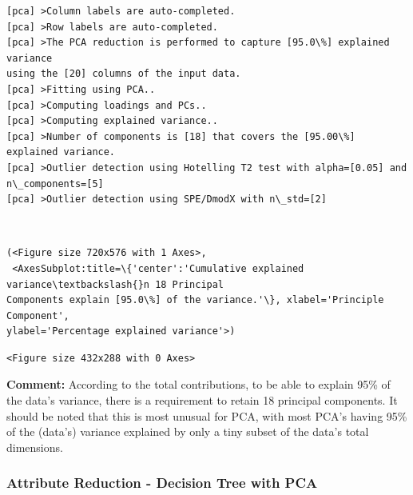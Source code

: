 \documentclass[11pt]{article}
\makeatletter
\newcommand{\boxspacing}{\kern\kvtcb@left@rule\kern\kvtcb@boxsep}
\newcommand{\prompt}[4]{
        {\ttfamily\llap{{\color{#2}[#3]:\hspace{3pt}#4}}\vspace{-\baselineskip}}
    }
\makeatother
\begin{document}
    \begin{Verbatim}[commandchars=\\\{\}]
[pca] >Column labels are auto-completed.
[pca] >Row labels are auto-completed.
[pca] >The PCA reduction is performed to capture [95.0\%] explained variance
using the [20] columns of the input data.
[pca] >Fitting using PCA..
[pca] >Computing loadings and PCs..
[pca] >Computing explained variance..
[pca] >Number of components is [18] that covers the [95.00\%] explained variance.
[pca] >Outlier detection using Hotelling T2 test with alpha=[0.05] and
n\_components=[5]
[pca] >Outlier detection using SPE/DmodX with n\_std=[2]
    \end{Verbatim}

    \begin{center}
    \end{center}
    { \hspace*{\fill} \\}
    
            \begin{tcolorbox}[breakable, size=fbox, boxrule=.5pt, pad at break*=1mm, opacityfill=0]
\prompt{Out}{outcolor}{67}{\boxspacing}
\begin{Verbatim}[commandchars=\\\{\}]
(<Figure size 720x576 with 1 Axes>,
 <AxesSubplot:title=\{'center':'Cumulative explained variance\textbackslash{}n 18 Principal
Components explain [95.0\%] of the variance.'\}, xlabel='Principle Component',
ylabel='Percentage explained variance'>)
\end{Verbatim}
\end{tcolorbox}
        
    
    \begin{Verbatim}[commandchars=\\\{\}]
<Figure size 432x288 with 0 Axes>
    \end{Verbatim}

    
    \textbf{Comment:} According to the total contributions, to be able to
explain 95\% of the data's variance, there is a requirement to retain 18
principal components. It should be noted that this is most unusual for
PCA, with most PCA's having 95\% of the (data's) variance explained by
only a tiny subset of the data's total dimensions.

    \hypertarget{attribute-reduction---decision-tree-with-pca}{%
\subsubsection{Attribute Reduction - Decision Tree with
PCA}\label{attribute-reduction---decision-tree-with-pca}}
\end{document}
